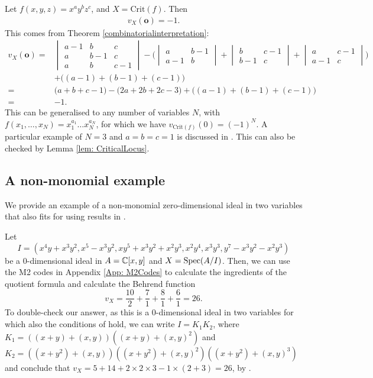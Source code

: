\documentclass[11pt,a4paper,leqno,noamsfonts]{amsart}
\numberwithin{equation}{section}
\begin{document}
\begin{example}\label{Ex: xyz}
    Let $f(x,y,z)=x^ay^bz^c$, and $X=\mathrm{Crit}(f)$. Then
    \begin{align*}
        v_X(\mathbf{o})=-1.
    \end{align*}
    This comes from Theorem \ref{combinatorialinterpretation}:
    \begin{align*}
       v_X(\mathbf{o})=& \begin{vmatrix}
a-1 & b & c\\
a & b-1 & c\\
a &b &c-1
\end{vmatrix}-\Big(\begin{vmatrix}
a & b-1 \\
a-1 & b 
\end{vmatrix}+\begin{vmatrix}
b & c-1 \\
b-1 & c 
\end{vmatrix}+\begin{vmatrix}
a & c-1 \\
a-1 & c 
\end{vmatrix}\Big)\\&+\Big((a-1)+(b-1)+(c-1)\Big)
\\=&\Big(a+b+c-1\Big)-\Big(2a+2b+2c-3\Big)+\Big((a-1)+(b-1)+(c-1)\Big)\\=&-1.
    \end{align*}
    This can be generalised to any number of variables $N$, with $f(x_1,\ldots,x_N)=x_1^{a_1}\ldots x_N^{a_N}$, for which we have $v_{\mathrm{Crit}(f)}(0)=(-1)^N$. A particular example of $N=3$ and $a=b=c=1$ is discussed in \cite[Example 2.5]{RicolfiSign}. This can also be checked by Lemma \ref{lem: CriticalLocus}.
\end{example}

\subsection{A non-monomial example} 
We provide an example of a non-monomial zero-dimensional ideal in two variables that also fits for using results in \cite{Graffeo-Ricolfi}.

\begin{example} 
    Let
    \[I=(x^4y+x^3y^2,x^5-x^3y^2,xy^5+x^3y^2+x^2y^3,x^2y^4,x^3y^3,y^7-x^3y^2-x^2y^3)\]
    be a $0$-dimensional ideal in $A={\mathbb{C}}[x,y]$ and $X=\operatorname{Spec}(A/I)$. Then, we can use the M2 codes in Appendix \ref{App: M2Codes}
to calculate the ingredients of the quotient formula and calculate the Behrend function
\[v_{X}=\frac{10}{2}+\frac{7}{1}+\frac{8}{1}+\frac{6}{1}=26.
\]
To double-check our answer, as this is a $0$-dimensional ideal in two variables for which also the conditions of \cite[Theorem 3.17 (2)]{Graffeo-Ricolfi} hold, we can write $I=K_1K_2$, where $K_1=((x+y)+(x,y))((x+y)+(x,y)^2)$ and $K_2=((x+y^2)+(x,y))((x+y^2)+(x,y)^2)((x+y^2)+(x,y)^3)$ and conclude that $v_X=5+14+2\times 2 \times 3-1\times (2+3)=26$, by \cite[Theorem 3.17 (2)]{Graffeo-Ricolfi}.
\end{example}
\end{document}

